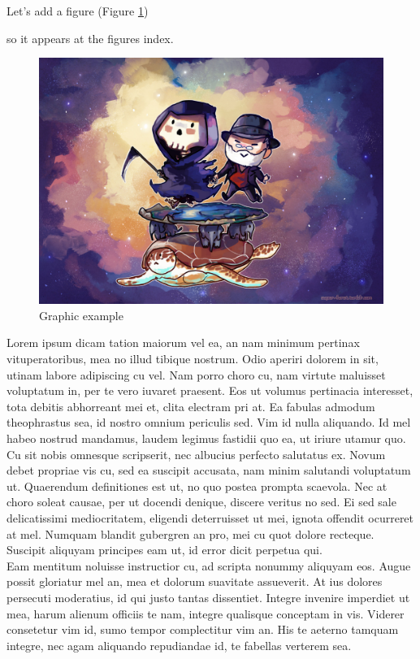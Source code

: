 Let's add a figure (Figure \ref{fig:terry_pratchett}) {so it appears at the figures index. 
\begin{figure}[h]
    \centering
    \includegraphics[scale=0.2]{images/terry_pratchett.jpg}
        \caption{Graphic example}
        \label{fig:terry_pratchett}
\end{figure}

Lorem ipsum dicam tation maiorum vel ea, an nam minimum pertinax vituperatoribus, mea no illud tibique nostrum. Odio aperiri dolorem in sit, utinam labore adipiscing cu vel. Nam porro choro cu, nam virtute maluisset voluptatum in, per te vero iuvaret praesent. Eos ut volumus pertinacia interesset, tota debitis abhorreant mei et, clita electram pri at. Ea fabulas admodum theophrastus sea, id nostro omnium periculis sed. Vim id nulla aliquando. Id mel habeo nostrud mandamus, laudem legimus fastidii quo ea, ut iriure utamur quo.\\

Cu sit nobis omnesque scripserit, nec albucius perfecto salutatus ex. Novum debet propriae vis cu, sed ea suscipit accusata, nam minim salutandi voluptatum ut. Quaerendum definitiones est ut, no quo postea prompta scaevola. Nec at choro soleat causae, per ut docendi denique, discere veritus no sed. Ei sed sale delicatissimi  mediocritatem, eligendi deterruisset ut mei, ignota offendit ocurreret at mel. Numquam blandit gubergren an pro, mei cu quot dolore recteque. Suscipit aliquyam principes eam ut, id error dicit perpetua qui.\\

Eam mentitum noluisse instructior cu, ad scripta nonummy aliquyam eos. Augue possit gloriatur mel an, mea et dolorum suavitate assueverit. At ius dolores persecuti moderatius, id qui justo tantas dissentiet. Integre invenire imperdiet ut mea, harum alienum officiis te nam, integre qualisque conceptam in vis. Viderer  consetetur vim id, sumo tempor complectitur vim an. His te aeterno tamquam integre, nec agam aliquando repudiandae id, te fabellas verterem sea.\\

}
